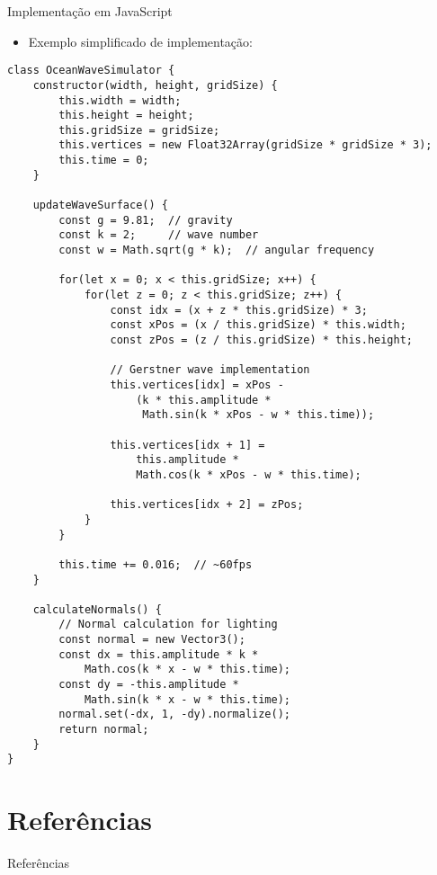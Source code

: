 \documentclass[aspectratio=169,xcolor=table]{beamer}
\begin{document}
\begin{frame}[fragile]{Implementação em JavaScript}
    \begin{itemize}
        \item Exemplo simplificado de implementação:
    \end{itemize}
    \begin{verbatim}
class OceanWaveSimulator {
    constructor(width, height, gridSize) {
        this.width = width;
        this.height = height;
        this.gridSize = gridSize;
        this.vertices = new Float32Array(gridSize * gridSize * 3);
        this.time = 0;
    }

    updateWaveSurface() {
        const g = 9.81;  // gravity
        const k = 2;     // wave number
        const w = Math.sqrt(g * k);  // angular frequency
        
        for(let x = 0; x < this.gridSize; x++) {
            for(let z = 0; z < this.gridSize; z++) {
                const idx = (x + z * this.gridSize) * 3;
                const xPos = (x / this.gridSize) * this.width;
                const zPos = (z / this.gridSize) * this.height;
                
                // Gerstner wave implementation
                this.vertices[idx] = xPos - 
                    (k * this.amplitude * 
                     Math.sin(k * xPos - w * this.time));
                     
                this.vertices[idx + 1] = 
                    this.amplitude * 
                    Math.cos(k * xPos - w * this.time);
                    
                this.vertices[idx + 2] = zPos;
            }
        }
        
        this.time += 0.016;  // ~60fps
    }

    calculateNormals() {
        // Normal calculation for lighting
        const normal = new Vector3();
        const dx = this.amplitude * k * 
            Math.cos(k * x - w * this.time);
        const dy = -this.amplitude * 
            Math.sin(k * x - w * this.time);
        normal.set(-dx, 1, -dy).normalize();
        return normal;
    }
}
    \end{verbatim}
\end{frame}

\section{Referências}
\begin{frame}[allowframebreaks]{Referências}
    
    
\end{frame}
\end{document}
